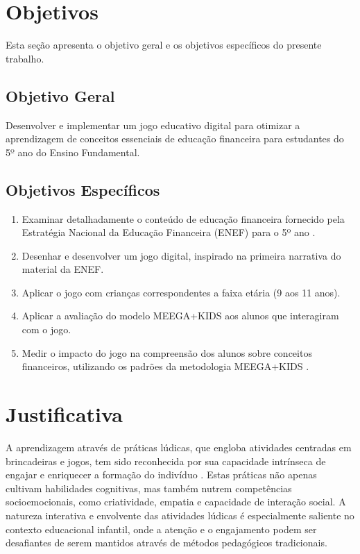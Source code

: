 \section{Objetivos}
Esta seção apresenta o objetivo geral e os objetivos específicos do presente trabalho.

\subsection{Objetivo Geral}
Desenvolver e implementar um jogo educativo digital para otimizar a aprendizagem de conceitos essenciais de educação financeira para estudantes do 5º ano do Ensino Fundamental.

\subsection{Objetivos Específicos}
\begin{enumerate}[noitemsep,nosep,labelindent=\parindent,leftmargin=*,label={\alph*}) ]
	\item Examinar detalhadamente o conteúdo de educação financeira fornecido pela Estratégia Nacional da Educação Financeira (ENEF) para o 5º ano \cite{Educacao_financeira_nas_escolas}.
	\item Desenhar e desenvolver um jogo digital, inspirado na primeira narrativa do material da ENEF.
	\item Aplicar o jogo com crianças correspondentes a faixa etária (9 aos 11 anos).
	\item Aplicar a avaliação do modelo MEEGA+KIDS \cite{GresseVonWangenheim2020} aos alunos que interagiram com o jogo.
	\item Medir o impacto do jogo na compreensão dos alunos sobre conceitos financeiros, utilizando os padrões da metodologia MEEGA+KIDS \cite{GresseVonWangenheim2020}.
\end{enumerate}

\section{Justificativa}

A aprendizagem através de práticas lúdicas, que engloba atividades centradas em brincadeiras e jogos, tem sido reconhecida por sua capacidade intrínseca de engajar e enriquecer a formação do indivíduo \cite{Santos_Thayna_da_silva_2021}. Estas práticas não apenas cultivam habilidades cognitivas, mas também nutrem competências socioemocionais, como criatividade, empatia e capacidade de interação social. A natureza interativa e envolvente das atividades lúdicas é especialmente saliente no contexto educacional infantil, onde a atenção e o engajamento podem ser desafiantes de serem mantidos através de métodos pedagógicos tradicionais.

